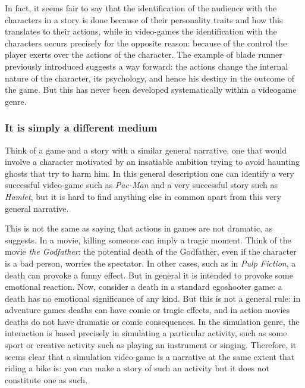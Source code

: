 \documentclass[
		twoside,openright,titlepage,numbers=noenddot,manychapters,
		headinclude,%
                footinclude=false,cleardoublepage=empty,
                BCOR=5mm,
		fontsize=11pt, %
                 enabledeprecatedfontcommands]{scrreprt}
\begin{document}
In fact, it seems fair to say that the identification of the audience with the characters in a story is done because of their personality traits and how this translates to their actions, while in video-games the identification with the characters occurs precisely for the opposite reason: because of the control the player exerts over the actions of the character. The example of blade runner previously introduced suggests a way forward: the actions change the internal nature of the character, its psychology, and hence his destiny in the outcome of the game. But this has never been developed systematically within a videogame genre.



\subsubsection{It is simply a different medium} 
Think of a game and a story with a similar general narrative, one that would involve a character  motivated by an insatiable ambition trying to avoid haunting ghosts that try to harm him. In this general description one can identify  a very successful video-game such as \emph{Pac-Man} and a very successful story such as \emph{Hamlet}, but it is hard to find anything else in common apart from this very general narrative.

This is not the same as saying that actions in games are not dramatic, as \cite{crawford2004cci} suggests.
In a movie, killing someone can imply a tragic moment. Think of the movie \emph{the Godfather}: the potential death of the Godfather, even if the character is a bad person, worries the spectator. In other cases, such as in \emph{Pulp Fiction}, a death can provoke a funny effect. But in general it is intended to provoke some emotional reaction. Now, consider a death in a standard egoshooter game: a death has no emotional significance of any kind. But this is not a general rule: in adventure games deaths can have comic or tragic effects, and in action movies deaths do not have dramatic or comic consequences.
 In the simulation genre, the interaction is based precisely in simulating a particular activity, such as some sport or creative activity such as playing an instrument or singing. Therefore, it seems clear that a simulation video-game is a narrative at the same extent that riding a bike is: you can make a story of such an activity but it does not constitute one as such. 
\end{document}
